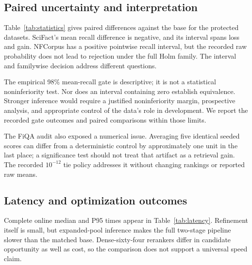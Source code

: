 \subsection{Paired uncertainty and interpretation}
Table~\ref{tab:statistics} gives paired differences against the base for the protected datasets. SciFact's mean recall difference is negative, and its interval spans loss and gain. NFCorpus has a positive pointwise recall interval, but the recorded raw probability does not lead to rejection under the full Holm family. The interval and familywise decision address different questions.

\begin{table}[t]
\centering\small
\caption{Recorded paired inference: reported refinement minus base on SciFact/NFCorpus. $\dagger$FiQA is its earlier base minus L6-only for the independently audited nDCG@5 comparison. Intervals are pointwise, not simultaneous; Holm decisions use each original full family.}
\label{tab:statistics}
\end{table}

The empirical 98\% mean-recall gate is descriptive; it is not a statistical noninferiority test. Nor does an interval containing zero establish equivalence. Stronger inference would require a justified noninferiority margin, prospective analysis, and appropriate control of the data's role in development. We report the recorded gate outcomes and paired comparisons within those limits.

The FiQA audit also exposed a numerical issue. Averaging five identical seeded scores can differ from a deterministic control by approximately one unit in the last place; a significance test should not treat that artifact as a retrieval gain. The recorded $10^{-12}$ tie policy addresses it without changing rankings or reported raw means.

\subsection{Latency and optimization outcomes}
Complete online median and P95 times appear in Table~\ref{tab:latency}. Refinement itself is small, but expanded-pool inference makes the full two-stage pipeline slower than the matched base. Dense-sixty-four rerankers differ in candidate opportunity as well as cost, so the comparison does not support a universal speed claim.

\begin{table}[t]
\centering\small\setlength{\tabcolsep}{6pt}
\caption{Composed online latency, milliseconds per seeded request. Values include all applicable upstream stages. P50/P95 are computed over recorded request totals; restoration, model loading, and warm-up are separate.}
\label{tab:latency}
\end{table}

